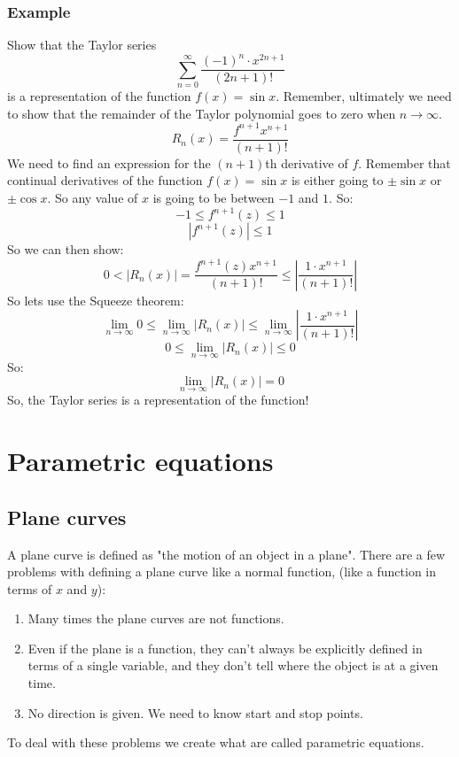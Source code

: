 \documentclass{report}
\begin{document}
    \subsection{Example}
        Show that the Taylor series
        \[\sum_{n=0}^{\infty} \frac{(-1)^n \cdot x^{2n+1}}{(2n+1)!}\]
        is a representation of the function \(f(x) = \sin x\).
        Remember, ultimately we need to show that the remainder of the Taylor polynomial goes to zero when \(n \to \infty\).
        \[R_n(x) = \frac{f^{n+1} x^{n+1}}{(n+1)!}\]
        We need to find an expression for the \((n+1)\)th derivative of \(f\).
        Remember that continual derivatives of the function \(f(x) = \sin x\) is either going to \(\pm \sin x\) or \(\pm \cos x\).
        So any value of \(x\) is going to be between \(-1\) and \(1\).
        So:
        \[-1 \leq f^{n+1}(z) \leq 1\]
        \[\left| f^{n+1}(z) \right| \leq 1\]
        So we can then show:
        \[0 < \left| R_n(x) \right| = \frac{f^{n+1}(z) x^{n+1}}{(n+1)!} \leq \left| \frac{1 \cdot x^{n+1}}{(n+1)!} \right|\]
        So lets use the Squeeze theorem:
        \[\lim_{n \to \infty} 0 \leq \lim_{n \to \infty} \left| R_n(x) \right| \leq \lim_{n \to \infty} \left| \frac{1 \cdot x^{n+1}}{(n+1)!} \right|\]
        \[0 \leq \lim_{n \to \infty} \left| R_n(x) \right| \leq 0 \]
        So:
        \[\lim_{n \to \infty} \left| R_n(x) \right| = 0\]
        So, the Taylor series is a representation of the function!

\chapter{Parametric equations}

\section{Plane curves}
    A plane curve is defined as "the motion of an object in a plane".
    There are a few problems with defining a plane curve like a normal function, (like a function in terms of \(x\) and \(y\)):
    \begin{enumerate}
        \item Many times the plane curves are not functions.
        \item Even if the plane is a function, they can't always be explicitly defined in terms of a single variable,
        and they don't tell where the object is at a given time.
        \item No direction is given. We need to know start and stop points.
    \end{enumerate} 
    To deal with these problems we create what are called parametric equations.
\end{document}
